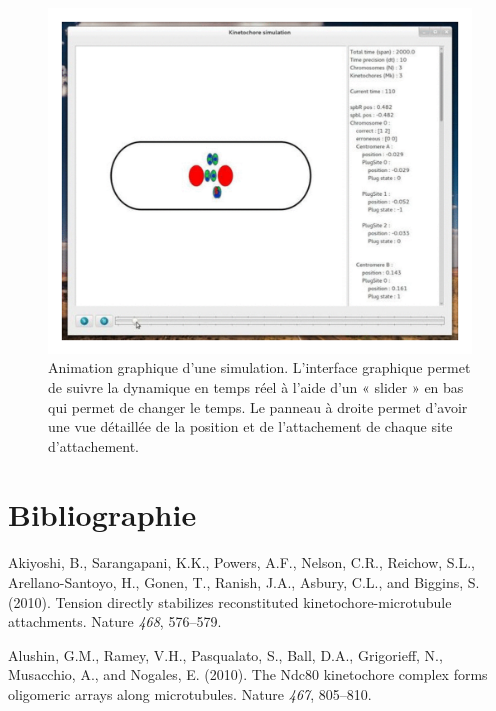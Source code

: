 \documentclass[12pt,a4paper,twoside,openright]{book}
\begin{document}
\begin{figure}[htbp]
\centering
\includegraphics{figures/annexes/gui.png}
\caption[Animation graphique d'une simulation]{\label{fig:kt-simul-gui}Animation
graphique d'une simulation. L'interface graphique permet de suivre la
dynamique en temps réel à l'aide d'un « slider » en bas qui permet de
changer le temps. Le panneau à droite permet d'avoir une vue détaillée
de la position et de l'attachement de chaque site d'attachement.}
\end{figure}

\backmatter

\chapter{Bibliographie}\label{bibliographie}



Akiyoshi, B., Sarangapani, K.K., Powers, A.F., Nelson, C.R., Reichow,
S.L., Arellano-Santoyo, H., Gonen, T., Ranish, J.A., Asbury, C.L., and
Biggins, S. (2010). Tension directly stabilizes reconstituted
kinetochore-microtubule attachments. Nature \emph{468}, 576--579.

Alushin, G.M., Ramey, V.H., Pasqualato, S., Ball, D.A., Grigorieff, N.,
Musacchio, A., and Nogales, E. (2010). The Ndc80 kinetochore complex
forms oligomeric arrays along microtubules. Nature \emph{467}, 805--810.
\end{document}
